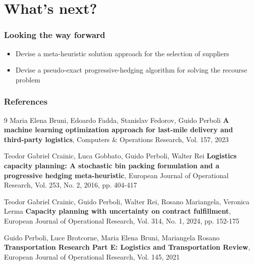 \documentclass[9pt,xcolor={dvipsnames}]{beamer}
\begin{document}
\section {What's next?}
\begin{frame}[allowframebreaks]
	\frametitle{Looking the way forward}
	\begin{itemize}
		\item Devise a meta-heuristic solution approach for the selection of suppliers 
		\bigskip
		\item Devise a pseudo-exact progressive-hedging algorithm for solving the recourse problem
	\end{itemize}
\end{frame}


\begin{frame}[shrink]
\frametitle{References}
\begin{thebibliography}{9}
 Maria Elena Bruni, Edoardo Fadda, Stanislav Fedorov, Guido Perboli
\textbf{ A machine learning optimization approach for last-mile delivery and third-party logistics},
Computers \& Operations Research, Vol. 157, 2023

 Teodor Gabriel Crainic, Luca Gobbato, Guido Perboli,  Walter Rei
\textbf{ Logistics capacity planning: A stochastic bin packing formulation and a progressive hedging meta-heuristic},
	European Journal of Operational Research, Vol. 253, No. 2, 2016, pp. 404-417

 Teodor Gabriel Crainic, Guido Perboli,  Walter Rei, Rosano Mariangela, Veronica Lerma
\textbf{ Capacity planning with uncertainty on contract fulfillment},
	European Journal of Operational Research, Vol. 314, No. 1, 2024, pp. 152-175

 Guido Perboli, Luce Brotcorne, Maria Elena Bruni, Mariangela Rosano
\textbf{ Transportation Research Part E: Logistics and Transportation Review},
	European Journal of Operational Research, Vol. 145, 2021


\end{thebibliography}
\end{frame}

%
\end{document}
